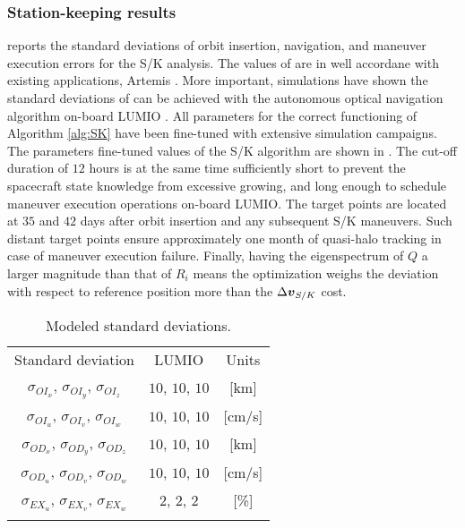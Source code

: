 \subsubsection{Station-keeping results}\label{subsubsec:S/K results}
 reports the standard deviations of orbit insertion, navigation, and maneuver execution errors for the S/K analysis. The values of  are in well accordane with existing applications, \eg Artemis \cite{folta2014artemis}. More important, simulations have shown the standard deviations of  can be achieved with the autonomous optical navigation algorithm on-board LUMIO \cite{franzese2018NavSciTech}. All parameters for the correct functioning of Algorithm \ref{alg:SK} have been fine-tuned with extensive simulation campaigns. The parameters fine-tuned values of the S/K algorithm are shown in . The cut-off duration of $12$ hours is at the same time sufficiently short to prevent the spacecraft state knowledge from excessive growing, and long enough to schedule maneuver execution operations on-board LUMIO. The target points are located at $35$ and $42$ days after orbit insertion and any subsequent S/K maneuvers. Such distant target points ensure approximately one month of quasi-halo tracking in case of maneuver execution failure. Finally, having the eigenspectrum of $Q$ a larger magnitude than that of $R_i$ means the optimization weighs the deviation with respect to reference position more than the $\Delta\boldsymbol{v}_{S/K}$ cost.
%
\begin{table}[b!]
	\centering
	\footnotesize
	\caption{Modeled standard deviations.}\label{tab:SKUncertainties}
	\begin{tabular}{ccc}
			\TOPlines
			Standard deviation & LUMIO & Units \\ 
			\MIDline				$\sigma_{OI_x}$, $\sigma_{OI_y}$, $\sigma_{OI_z}$ & $10$, $10$, $10$ & [km] \\
			$\sigma_{OI_u}$, $\sigma_{OI_v}$, $\sigma_{OI_w}$ & $10$, $10$, $10$ & [cm/s] \\
			$\sigma_{OD_x}$, $\sigma_{OD_y}$, $\sigma_{OD_z}$ & $10$, $10$, $10$ & [km] \\
			$\sigma_{OD_u}$, $\sigma_{OD_v}$, $\sigma_{OD_w}$ & $10$, $10$, $10$ & [cm/s] \\
			$\sigma_{EX_u}$, $\sigma_{EX_v}$, $\sigma_{EX_w}$ & $2$, $2$, $2$ & [\%] \\
			\BOTTOMlines
		\end{tabular}
\end{table}
